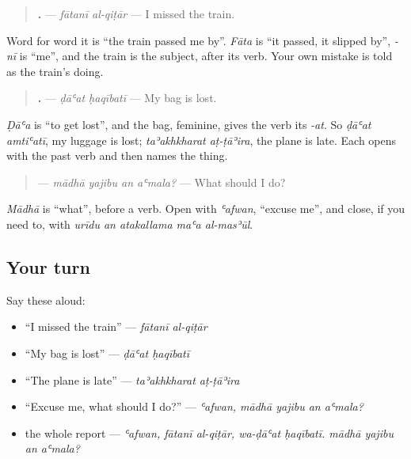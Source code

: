 \begin{grammarlens}[title={Grammar Lens: the thing did it}]
\begin{quote}
\textbf{ .} — \emph{fātanī al-qiṭār} — I missed the train.
\end{quote}

Word for word it is \textquotedblleft{}the train passed me by\textquotedblright{}. \emph{Fāta} is \textquotedblleft{}it passed, it slipped by\textquotedblright{}, \emph{-nī} is \textquotedblleft{}me\textquotedblright{}, and the train is the subject, after its verb. Your own mistake is told as the train's doing.

\begin{quote}
\textbf{ .} — \emph{ḍāʿat ḥaqībatī} — My bag is lost.
\end{quote}

\emph{Ḍāʿa} is \textquotedblleft{}to get lost\textquotedblright{}, and the bag, feminine, gives the verb its \emph{-at}. So \emph{ḍāʿat amtiʿatī}, my luggage is lost; \emph{taʾakhkharat aṭ-ṭāʾira}, the plane is late. Each opens with the past verb and then names the thing.
\end{grammarlens}

\begin{grammarlens}[title={Grammar Lens: asking for help}]
\begin{quote}
\textbf{   } — \emph{mādhā yajibu an aʿmala?} — What should I do?
\end{quote}

\emph{Mādhā} is \textquotedblleft{}what\textquotedblright{}, before a verb. Open with \emph{ʿafwan}, \textquotedblleft{}excuse me\textquotedblright{}, and close, if you need to, with \emph{urīdu an atakallama maʿa al-masʾūl}.
\end{grammarlens}

\subsection*{Your turn}
Say these aloud:

\begin{itemize}
\raggedright
  \item \textquotedblleft{}I missed the train\textquotedblright{} — \emph{fātanī al-qiṭār}
  \item \textquotedblleft{}My bag is lost\textquotedblright{} — \emph{ḍāʿat ḥaqībatī}
  \item \textquotedblleft{}The plane is late\textquotedblright{} — \emph{taʾakhkharat aṭ-ṭāʾira}
  \item \textquotedblleft{}Excuse me, what should I do?\textquotedblright{} — \emph{ʿafwan, mādhā yajibu an aʿmala?}
  \item the whole report — \emph{ʿafwan, fātanī al-qiṭār, wa-ḍāʿat ḥaqībatī. mādhā yajibu an aʿmala?}
\end{itemize}

